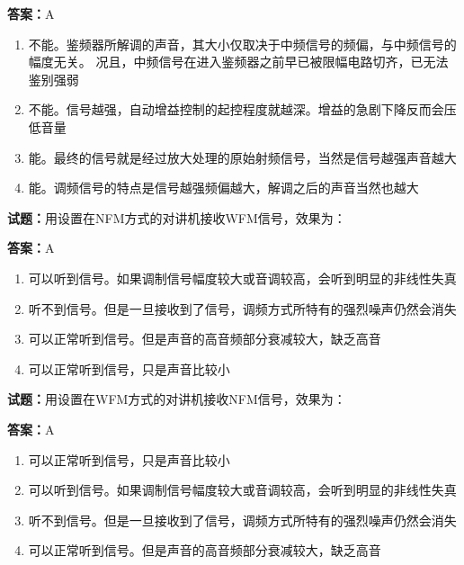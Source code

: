\documentclass{ctexbook}
\begin{document}
\textbf{答案：}A 

\begin{enumerate}[leftmargin=3em]
  \item 不能。鉴频器所解调的声音，其大小仅取决于中频信号的频偏，与中频信号的幅度无关。
况且，中频信号在进入鉴频器之前早已被限幅电路切齐，已无法鉴别强弱 

  \item 不能。信号越强，自动增益控制的起控程度就越深。增益的急剧下降反而会压低音量 

  \item 能。最终的信号就是经过放大处理的原始射频信号，当然是信号越强声音越大 

  \item 能。调频信号的特点是信号越强频偏越大，解调之后的声音当然也越大 

\end{enumerate}





\vspace{1em}

\textbf{试题：}用设置在NFM方式的对讲机接收WFM信号，效果为： 

\textbf{答案：}A 

\begin{enumerate}[leftmargin=3em]
  \item 可以听到信号。如果调制信号幅度较大或音调较高，会听到明显的非线性失真 

  \item 听不到信号。但是一旦接收到了信号，调频方式所特有的强烈噪声仍然会消失 

  \item 可以正常听到信号。但是声音的高音频部分衰减较大，缺乏高音 

  \item 可以正常听到信号，只是声音比较小 

\end{enumerate}





\vspace{1em}

\textbf{试题：}用设置在WFM方式的对讲机接收NFM信号，效果为： 

\textbf{答案：}A 

\begin{enumerate}[leftmargin=3em]
  \item 可以正常听到信号，只是声音比较小 

  \item 可以听到信号。如果调制信号幅度较大或音调较高，会听到明显的非线性失真 

  \item 听不到信号。但是一旦接收到了信号，调频方式所特有的强烈噪声仍然会消失 


  \item 可以正常听到信号。但是声音的高音频部分衰减较大，缺乏高音 

\end{enumerate}
\end{document}
